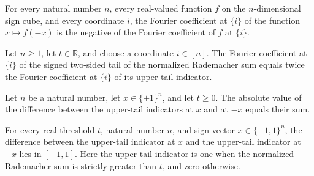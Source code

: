 \begin{theorem}
\label{FABL.fourierCoeff_comp_neg_singleton}
\leanok
{}
For every natural number $n$, every real-valued function $f$ on the $n$-dimensional sign
cube, and every coordinate $i$, the Fourier coefficient at $\{i\}$ of the function
$x\mapsto f(-x)$ is the negative of the Fourier coefficient of $f$ at $\{i\}$.
\end{theorem}

\begin{theorem}
\label{FABL.fourierCoeff_signedHammingTwoTail_singleton}
\leanok
{}
Let $n\geq 1$, let $t\in\mathbb R$, and choose a coordinate $i\in[n]$. The Fourier
coefficient at $\{i\}$ of the signed two-sided tail of the normalized Rademacher sum
equals twice the Fourier coefficient at $\{i\}$ of its upper-tail indicator.
\end{theorem}

\begin{theorem}
\label{FABL.abs_signedHammingTwoTail}
\leanok
{}
Let $n$ be a natural number, let $x\in\{\pm1\}^n$, and let $t\ge 0$. The absolute value
of the difference between the upper-tail indicators at $x$ and at $-x$ equals their sum.
\end{theorem}

\begin{theorem}
\label{FABL.signedHammingTwoTail_mem_Icc}
\leanok
{}
For every real threshold $t$, natural number $n$, and sign vector $x\in\{-1,1\}^n$, the
difference between the upper-tail indicator at $x$ and the upper-tail indicator at $-x$
lies in $[-1,1]$. Here the upper-tail indicator is one when the normalized Rademacher
sum is strictly greater than $t$, and zero otherwise.
\end{theorem}

